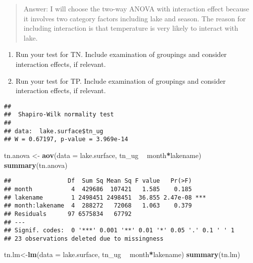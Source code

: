 \documentclass[]{article}
\newenvironment{Shaded}{\begin{snugshade}}{\end{snugshade}}
\newcommand{\CommentTok}[1]{\textcolor[rgb]{0.56,0.35,0.01}{\textit{#1}}}
\newcommand{\DataTypeTok}[1]{\textcolor[rgb]{0.13,0.29,0.53}{#1}}
\newcommand{\KeywordTok}[1]{\textcolor[rgb]{0.13,0.29,0.53}{\textbf{#1}}}
\newcommand{\NormalTok}[1]{#1}
\newcommand{\OperatorTok}[1]{\textcolor[rgb]{0.81,0.36,0.00}{\textbf{#1}}}
\newcommand{\StringTok}[1]{\textcolor[rgb]{0.31,0.60,0.02}{#1}}
\begin{document}
\begin{quote}
Answer: I will choose the two-way ANOVA with interaction effect because
it involves two category factors including lake and season. The reason
for including interaction is that temperature is very likely to interact
with lake.
\end{quote}

\begin{enumerate}
\def\labelenumi{\arabic{enumi}.}
\setcounter{enumi}{4}
\item
  Run your test for TN. Include examination of groupings and consider
  interaction effects, if relevant.
\item
  Run your test for TP. Include examination of groupings and consider
  interaction effects, if relevant.
\end{enumerate}

\begin{Shaded}
\end{Shaded}

\begin{verbatim}
## 
##  Shapiro-Wilk normality test
## 
## data:  lake.surface$tn_ug
## W = 0.67197, p-value = 3.969e-14
\end{verbatim}

\begin{Shaded}
\begin{Highlighting}[]
\NormalTok{tn.anova <-}\StringTok{ }\KeywordTok{aov}\NormalTok{(}\DataTypeTok{data =}\NormalTok{ lake.surface, tn_ug }\OperatorTok{~}\StringTok{ }\NormalTok{month}\OperatorTok{*}\NormalTok{lakename)}
\KeywordTok{summary}\NormalTok{(tn.anova)}
\end{Highlighting}
\end{Shaded}

\begin{verbatim}
##                Df  Sum Sq Mean Sq F value   Pr(>F)    
## month           4  429686  107421   1.585    0.185    
## lakename        1 2498451 2498451  36.855 2.47e-08 ***
## month:lakename  4  288272   72068   1.063    0.379    
## Residuals      97 6575834   67792                     
## ---
## Signif. codes:  0 '***' 0.001 '**' 0.01 '*' 0.05 '.' 0.1 ' ' 1
## 23 observations deleted due to missingness
\end{verbatim}

\begin{Shaded}
\begin{Highlighting}[]
\NormalTok{tn.lm<-}\KeywordTok{lm}\NormalTok{(}\DataTypeTok{data =}\NormalTok{ lake.surface, tn_ug }\OperatorTok{~}\StringTok{ }\NormalTok{month}\OperatorTok{*}\NormalTok{lakename)}
\KeywordTok{summary}\NormalTok{(tn.lm)}
\end{Highlighting}
\end{Shaded}
\end{document}
